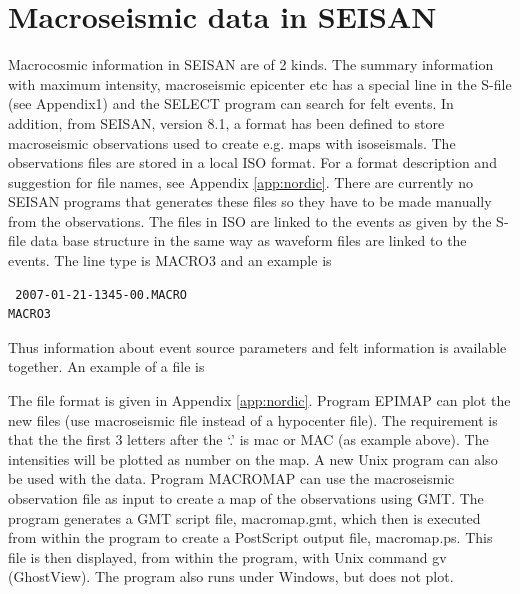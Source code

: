 
\section{Macroseismic data in SEISAN} 
\label{sect:macro}

 Macrocosmic information in SEISAN are of 2 kinds. The summary information with maximum intensity, macroseismic epicenter etc has a special line in the S-file (see Appendix1) and the SELECT program can search for felt events. In addition, from SEISAN, version 8.1, a format has been defined to store macroseismic observations used to create e.g. maps with isoseismals. The observations files are stored in a local ISO format. For a format description and suggestion for file names, see Appendix \ref{app:nordic}.
There are currently no SEISAN programs that generates these files so they have to be made manually from the observations. The files in ISO are linked to the events as given by the S-file data base structure in the same way as waveform files are linked to the events. The line type is MACRO3 and an example is 

\begin{small}
\begin{verbatim}
 2007-01-21-1345-00.MACRO                                            MACRO3 
\end{verbatim}
\end{small}

Thus information about event source parameters and felt information is available together. An 
example of a file is  



The file format is given in Appendix \ref{app:nordic}. Program EPIMAP can plot the new files (use  macroseismic file instead of a hypocenter file). The requirement is that the the first 3 letters after the `.' is mac or MAC (as example above). The intensities will be plotted as number on the map. A new Unix program can also be used with the data. Program MACROMAP can use the macroseismic observation file as input to create a map of the observations using GMT. The program generates a GMT script file, macromap.gmt, which then is executed from within the program to create a PostScript output file,  macromap.ps. This file is then displayed, from within the program, with Unix command gv (GhostView).
The program also runs under Windows, but does not plot. 

